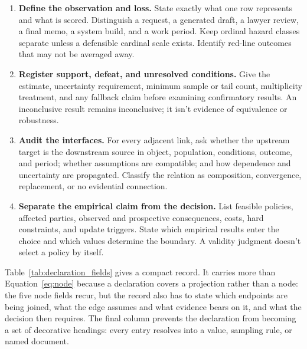 \documentclass[12pt]{article}
\begin{document}
\begin{enumerate}
\item \textbf{Define the observation and loss.} State exactly what one row represents and what is scored. Distinguish a request, a generated draft, a lawyer review, a final memo, a system build, and a work period. Keep ordinal hazard classes separate unless a defensible cardinal scale exists. Identify red-line outcomes that may not be averaged away.

\item \textbf{Register support, defeat, and unresolved conditions.} Give the estimate, uncertainty requirement, minimum sample or tail count, multiplicity treatment, and any fallback claim before examining confirmatory results. An inconclusive result remains inconclusive; it isn't evidence of equivalence or robustness.

\item \textbf{Audit the interfaces.} For every adjacent link, ask whether the upstream target is the downstream source in object, population, conditions, outcome, and period; whether assumptions are compatible; and how dependence and uncertainty are propagated. Classify the relation as composition, convergence, replacement, or no evidential connection.

\item \textbf{Separate the empirical claim from the decision.} List feasible policies, affected parties, observed and prospective consequences, costs, hard constraints, and update triggers. State which empirical results enter the choice and which values determine the boundary. A validity judgment doesn't select a policy by itself.
\end{enumerate}

Table~\ref{tab:declaration_fields} gives a compact record. It carries more than Equation~\ref{eq:node} because a declaration covers a projection rather than a node: the five node fields recur, but the record also has to state which endpoints are being joined, what the edge assumes and what evidence bears on it, and what the decision then requires. The final column prevents the declaration from becoming a set of decorative headings: every entry resolves into a value, sampling rule, or named document.
\end{document}
